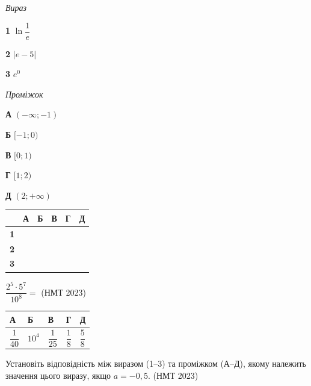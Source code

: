 \documentclass[14pt]{extarticle}
\newcommand{\answerTableBig}[5]{
\begin{center}
\begin{tabular}{|*{5}{>{\centering\arraybackslash}m{2.8cm}|}}
\hline
\rule[-0.3cm]{0pt}{0.8cm}\textbf{А} & \textbf{Б} & \textbf{В} & \textbf{Г} & \textbf{Д} \\
\hline
\rule[-0.6cm]{0pt}{1.4cm}#1 & \rule[-0.6cm]{0pt}{1.4cm}#2 & \rule[-0.6cm]{0pt}{1.4cm}#3 & \rule[-0.6cm]{0pt}{1.4cm}#4 & \rule[-0.6cm]{0pt}{1.4cm}#5 \\
\hline
\end{tabular}
\end{center}
}
\newcommand{\matchTable}{
\begin{tabular}{|>{\centering\arraybackslash}p{0.2cm}|*{5}{>{\centering\arraybackslash}p{0.2cm}|}}
\hline
& \textbf{А} & \textbf{Б} & \textbf{В} & \textbf{Г} & \textbf{Д} \\
\hline
\textbf{1} & \rule{0pt}{0.2cm} & & & & \\
\hline
\textbf{2} & \rule{0pt}{0.2cm} & & & & \\
\hline
\textbf{3} & \rule{0pt}{0.2cm} & & & & \\
\hline
\end{tabular}
}
\newcommand{\task}[2]{\noindent\makebox[1.5em][l]{\textbf{#1.}}\parbox[t]{\dimexpr\textwidth-1.5em}{#2}}
\newcommand{\nmtyear}[1]{\hfill{\small\color{yearcolor}(НМТ #1)}}
\begin{document}
\vspace{0.3cm}
\begin{minipage}{0.3\textwidth}
\textit{Вираз}

\vspace{0.2cm}
\textbf{1} \quad $\ln \dfrac{1}{e}$

\vspace{0.3cm}
\textbf{2} \quad $|e - 5|$

\vspace{0.2cm}
\textbf{3} \quad $e^0$
\end{minipage}
\hfill
\begin{minipage}{0.35\textwidth}
\textit{Проміжок}

\vspace{0.2cm}
\textbf{А} \quad $(-\infty; -1)$

\vspace{0.2cm}
\textbf{Б} \quad $[-1; 0)$

\vspace{0.2cm}
\textbf{В} \quad $[0; 1)$

\vspace{0.2cm}
\textbf{Г} \quad $[1; 2)$

\vspace{0.2cm}
\textbf{Д} \quad $(2; +\infty)$
\end{minipage}
\hfill
\begin{minipage}{0.2\textwidth}
\matchTable
\end{minipage}

\vspace{0.7cm}

\task{10}{$\dfrac{2^5 \cdot 5^7}{10^8} =$ \nmtyear{2023}}
\answerTableBig{$\dfrac{1}{40}$}{$10^4$}{$\dfrac{1}{25}$}{$\dfrac{1}{8}$}{$\dfrac{5}{8}$}

\vspace{0.5cm}

\task{11}{Установіть відповідність між виразом (1--3) та проміжком (А--Д), якому належить значення цього виразу, якщо $a = -0{,}5$. \nmtyear{2023}}
\end{document}
